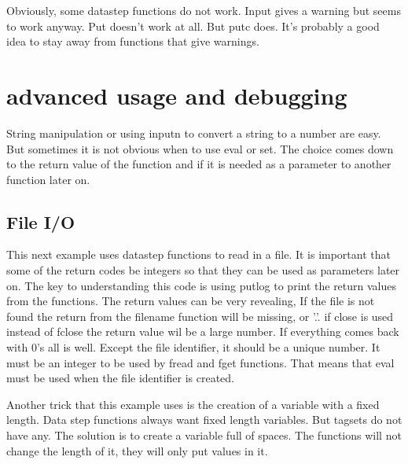 Obviously, some datastep functions do not work.  Input gives a warning but
seems to work anyway.  Put doesn't work at all.  But putc does.  It's probably
a good idea to stay away from functions that give warnings.

\section{advanced usage and debugging}
String
manipulation or using inputn to convert a string to a number are easy.  But
sometimes it is not obvious when to use eval or set.  The choice comes down
to the return value of the function and if it is needed as a parameter to 
another function later on.  

\subsection{File I/O}
\label{readfile}
This next example uses datastep functions to read in a file.  It is important
that some of the return codes be integers so that they can be used as parameters
later on.  The key to understanding this code is using putlog to print the return
values from the functions.  The return values can be very revealing, If the file
is not found the return from the filename function will be missing, or '.'.  if
close is used instead of fclose the return value wil be a large number.  If everything
comes back with 0's all is well.  Except the file identifier, it should be a unique 
number.  It must be an integer to be used by fread and fget functions.  That means 
that eval must be used when the file identifier is created.

Another trick that this example uses is the creation of a variable with a fixed length.
Data step functions always want fixed length variables.  But tagsets do not have any.
The solution is to create a variable full of spaces.  The functions will not change
the length of it, they will only put values in it.

